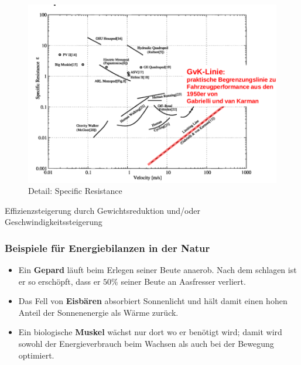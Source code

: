 \begin{figure}
	\includegraphics[width=\textwidth]{figures/specific_resistance.png}
	\caption{Detail: Specific Resistance}
\end{figure}

Effizienzsteigerung durch Gewichtsreduktion und/oder Geschwindigkeitssteigerung

\subsubsection{Beispiele für Energiebilanzen in der Natur}
\begin{itemize}
	\item Ein \textbf{Gepard} läuft beim Erlegen seiner Beute anaerob. Nach dem schlagen ist er so erschöpft, dass er $50\%$ seiner Beute an Aasfresser verliert.
	\item Das Fell von \textbf{Eisbären} absorbiert Sonnenlicht und hält damit einen hohen Anteil der Sonnenenergie als Wärme zurück.
	\item Ein biologische \textbf{Muskel} wächst nur dort wo er benötigt wird; damit wird sowohl der Energieverbrauch beim Wachsen als auch bei der Bewegung optimiert.
\end{itemize}